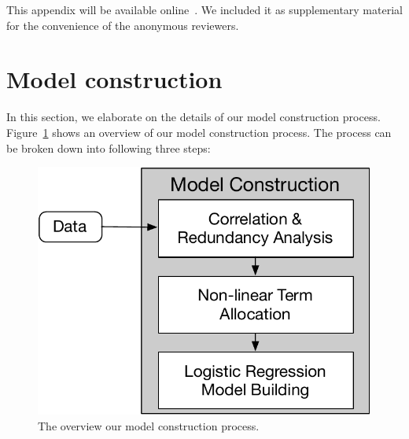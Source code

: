 \documentclass[10pt,journal,compsoc]{IEEEtran}
\begin{document}
	\begin{appendices}
	This appendix will be available online~\cite{appendix}. We included it as supplementary material for the convenience of the anonymous reviewers.

      \section{Model construction}
      In this section, we elaborate on the details of our model construction process. Figure~\ref{fig:flowMC} shows an overview of our model construction process. The process can be broken down into following three steps:
	
	  \begin{figure}[b]
        \centering\includegraphics[width=.7\columnwidth]{pics/appendix/mondelconstruction}
        \caption{The overview our model construction process.}
        \label{fig:flowMC}
        \vspace{-0.2in}
      \end{figure}
	

\end{appendices}
\end{document}
